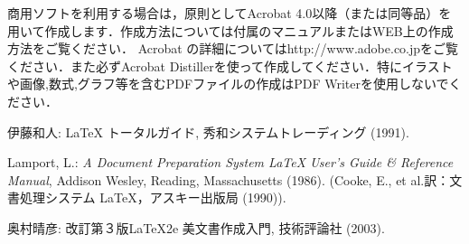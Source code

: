 \documentclass[a4j]{jarticle}
\begin{document}
\begin{Abstract}
\begin{enumerate}
商用ソフトを利用する場合は，原則としてAcrobat 4.0以降（または同等品）を用いて作成します．作成方法については付属のマニュアルまたはWEB上の作成方法をご覧ください．
Acrobat の詳細についてはhttp://www.adobe.co.jpをご覧ください．また必ずAcrobat Distillerを使って作成してください．特にイラストや画像,数式,グラフ等を含むPDFファイルの作成はPDF Writerを使用しないでください．

\end{enumerate}


\begin{thebibliography}{99}
伊藤和人: {\LaTeX} トータルガイド, 秀和システムトレーディング (1991).

Lamport, L.: {\em A Document Preparation System {\LaTeX} User's Guide \&
  Reference Manual\/}, Addison Wesley, Reading, Massachusetts (1986).
\newblock (Cooke, E., et al.訳：文書処理システム {\LaTeX}，アスキー出版局
  (1990)).

奥村晴彦: 改訂第３版{\LaTeX2e} 美文書作成入門, 技術評論社 (2003).

\end{thebibliography}

\end{Abstract}
\end{document}
